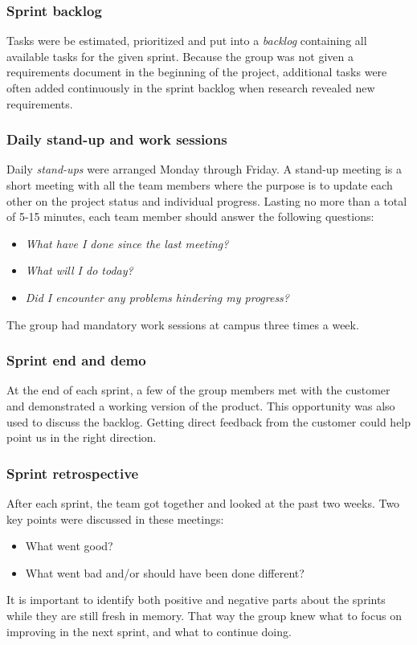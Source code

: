\subsubsection{Sprint backlog}
Tasks were be estimated, prioritized and put into a \emph{backlog} containing all available tasks for the given sprint. Because the group was not given a requirements document in the beginning of the project, additional tasks were often added continuously in the sprint backlog when research revealed new requirements.


\subsubsection{Daily stand-up and work sessions}
Daily \emph{stand-ups} were arranged Monday through Friday. A stand-up meeting is a short meeting with all the team members where the purpose is to update each other on the project status and individual progress. Lasting no more than a total of 5-15 minutes, each team member should answer the following questions:
\begin{itemize}
     \item \emph{What have I done since the last meeting?}
     \item \emph{What will I do today?}
     \item \emph{Did I encounter any problems hindering my progress?}
\end{itemize}
\noindent
The group had mandatory work sessions at campus three times a week.


\subsubsection{Sprint end and demo}
At the end of each sprint, a few of the group members met with the customer and demonstrated a working version of the product. This opportunity was also used to discuss the backlog. Getting direct feedback from the customer could help point us in the right direction.


\subsubsection{Sprint retrospective}
After each sprint, the team got together and looked at the past two weeks. Two key points were discussed in these meetings:

\begin{itemize}
     \item What went good?
     \item What went bad and/or should have been done different?
\end{itemize}
\noindent
It is important to identify both positive and negative parts about the sprints while they are still fresh in memory. That way the group knew what to focus on improving in the next sprint, and what to continue doing.

